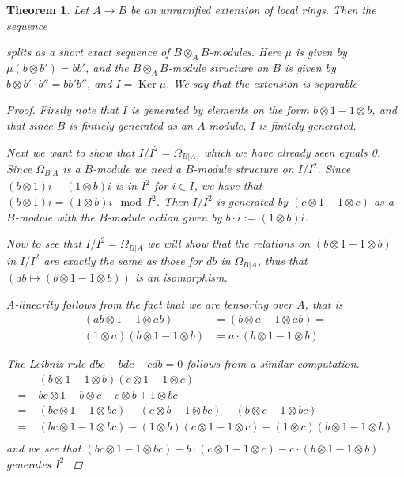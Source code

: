 \documentclass[11pt, a4paper, english]{article}
\numberwithin{prop}{section}
\numberwithin{lemma}{section}
\newtheorem{theorem}{Theorem}
\numberwithin{theorem}{section}
\numberwithin{defin}{section}
\numberwithin{example}{section}
\DeclareMathOperator{\Ker}{Ker}
\begin{document}
\begin{theorem}
Let $A \to B$ be an unramified extension of local rings. Then the sequence
\begin{center}
\end{center}
splits as a short exact sequence of $B\otimes_AB$-modules. Here $\mu$ is given by $\mu(b \otimes b') = bb'$, and the $B \otimes_A B$-module structure on $B$ is given by $b \otimes b' \cdot b'' = bb'b''$, and $I = \Ker \mu$. We say that the extension is separable

\begin{proof}
Firstly note that $I$ is generated by elements on the form $b \otimes 1 - 1 \otimes b$, and that since $B$ is fintiely generated as an $A$-module, $I$ is finitely generated.

Next we want to show that $I/I^2 = \Omega_{B|A}$, which we have already seen equals 0. Since $\Omega_{B|A}$ is a $B$-module we need a $B$-module structure on $I/I^2$. Since $(b \otimes 1)i - (1\otimes b)i$ is in $I^2$ for $i \in I$, we have that $(b \otimes 1)i = (1 \otimes b)i \mod I^2$. Then $I/I^2$ is generated by $(c \otimes 1 - 1 \otimes c)$ as a $B$-module with the $B$-module action given by $b \cdot i := (1 \otimes b)i$.

Now to see that $I/I^2 = \Omega_{B|A}$ we will show that the relations on $(b \otimes 1 - 1 \otimes b)$ in $I/I^2$ are exactly the same as those for $db$ in $\Omega_{B|A}$, thus that $(db \mapsto (b \otimes 1 - 1 \otimes b))$ is an isomorphism.

$A$-linearity follows from the fact that we are tensoring over $A$, that is
\begin{align*}
(ab \otimes 1 - 1 \otimes ab) &= (b \otimes a - 1 \otimes ab) =\\ 
(1 \otimes a)(b \otimes 1 - 1 \otimes b) &= a \cdot 
(b \otimes 1 - 1 \otimes b)
\end{align*}

The Leibniz rule $dbc - bdc - cdb = 0$ follows from a similar computation.
\begin{align*}
& \;(b \otimes 1 - 1 \otimes b)(c \otimes 1 - 1 \otimes c) \\
=&\; bc \otimes 1 - b \otimes c - c \otimes b + 1 \otimes bc \\
=&\; (bc \otimes 1 - 1 \otimes bc) - (c \otimes b - 1 \otimes bc) - (b \otimes c - 1 \otimes bc)\\
=&\; (bc \otimes 1 - 1 \otimes bc) - (1 \otimes b)(c \otimes 1 - 1 \otimes c) - (1 \otimes c)(b \otimes 1 - 1 \otimes b)\\
\end{align*}
and we see that $(bc \otimes 1 - 1 \otimes bc) - b \cdot (c \otimes 1 - 1 \otimes c) - c \cdot (b \otimes 1 - 1 \otimes b)$ generates $I^2$.


\end{proof}
\end{theorem}
\end{document}
